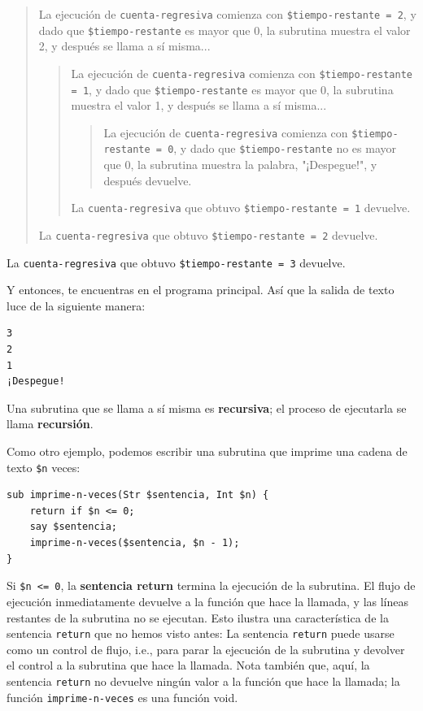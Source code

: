 \begin{quote}
La ejecución de {\tt cuenta-regresiva} comienza con 
{\tt \$tiempo-restante = 2}, y dado que {\tt \$tiempo-restante}
es mayor que 0, la subrutina muestra el valor 2, y después
se llama a sí misma...

\begin{quote}
La ejecución de {\tt cuenta-regresiva} comienza con 
{\tt \$tiempo-restante = 1}, y dado que {\tt \$tiempo-restante}
es mayor que 0, la subrutina muestra el valor 1, y después
se llama a sí misma...

\begin{quote}
La ejecución de {\tt cuenta-regresiva} comienza con 
{\tt \$tiempo-restante = 0}, y dado que {\tt \$tiempo-restante}
no es mayor que 0, la subrutina muestra la palabra, "¡Despegue!",
y después devuelve.
\end{quote}

La {\tt cuenta-regresiva} que obtuvo {\tt \$tiempo-restante = 1} devuelve.
\end{quote}


La {\tt cuenta-regresiva} que obtuvo {\tt \$tiempo-restante = 2} devuelve.
\end{quote}


La {\tt cuenta-regresiva} que obtuvo {\tt \$tiempo-restante = 3} devuelve.

Y entonces, te encuentras en el programa principal. Así que la
salida de texto luce de la siguiente manera:

\begin{verbatim}
3
2
1
¡Despegue!
\end{verbatim}
%
Una subrutina que se llama a sí misma es {\bf recursiva};
el proceso de ejecutarla se llama {\bf recursión}.

Como otro ejemplo, podemos escribir una subrutina que 
imprime una cadena de texto {\tt \$n} veces:

\begin{verbatim}
sub imprime-n-veces(Str $sentencia, Int $n) {
    return if $n <= 0;
    say $sentencia;
    imprime-n-veces($sentencia, $n - 1);
}
\end{verbatim}
%
Si {\tt \$n <= 0}, la {\bf sentencia return} termina la ejecución 
de la subrutina. El flujo de ejecución inmediatamente devuelve
a la función que hace la llamada, y las líneas restantes de la
subrutina no se ejecutan. Esto ilustra una característica de la 
sentencia {\tt return} que no hemos visto antes: La sentencia
{\tt return} puede usarse como un control de flujo, i.e., para 
parar la ejecución de la subrutina y devolver el control
a la subrutina que hace la llamada. Nota también que, aquí,
la sentencia {\tt return} no devuelve ningún valor a la función
que hace la llamada; la función {\tt imprime-n-veces} es una
función void.

